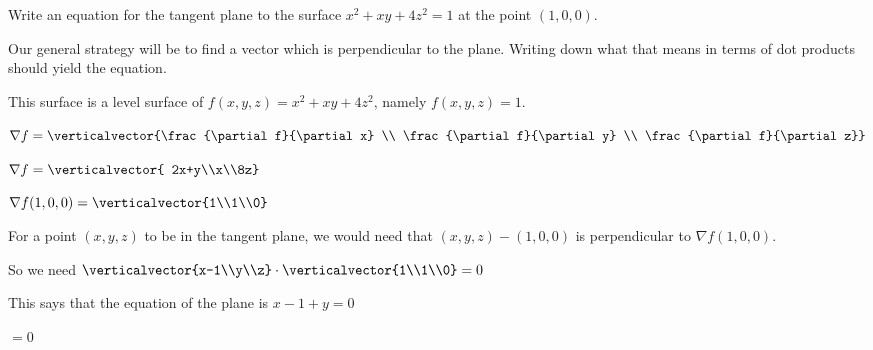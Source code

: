 \documentclass{ximera}
\begin{document}
\begin{question}
	Write an equation for the tangent plane to the surface $x^2+xy+4z^2 = 1$ at the point $(1,0,0)$.
		\begin{solution}
			\begin{hint}
				Our general strategy will be to find a vector which is perpendicular to the plane.  Writing down what that means in terms of dot products should
				yield the equation.
			\end{hint}
			\begin{hint}
				This surface is a level surface of $f(x,y,z) = x^2+xy+4z^2$, namely $f(x,y,z) = 1$.
			\end{hint}
			\begin{hint}
				$\nabla f  = \verticalvector{\frac{\partial f}{\partial x} \\ \frac{\partial f}{\partial y} \\ \frac{\partial f}{\partial z}}$
			\end{hint}
			\begin{hint}
				$\nabla f  =\verticalvector{ 2x+y\\x\\8z}$
			\end{hint}
			\begin{hint}
				$\nabla f (1,0,0) = \verticalvector{1\\1\\0} $
			\end{hint}
			\begin{hint}
				For a point $(x,y,z)$ to be in the tangent plane, we would need that $(x,y,z) - (1,0,0)$ is perpendicular to $\nabla f (1,0,0)$.
			\end{hint}
			\begin{hint}
				So we need $\verticalvector{x-1\\y\\z} \cdot \verticalvector{1\\1\\0} = 0$
			\end{hint}
			\begin{hint}
				This says that the equation of the plane is $x-1+y=0$
			\end{hint}
			 $= 0$
		\end{solution}
\end{question}
\end{document}
